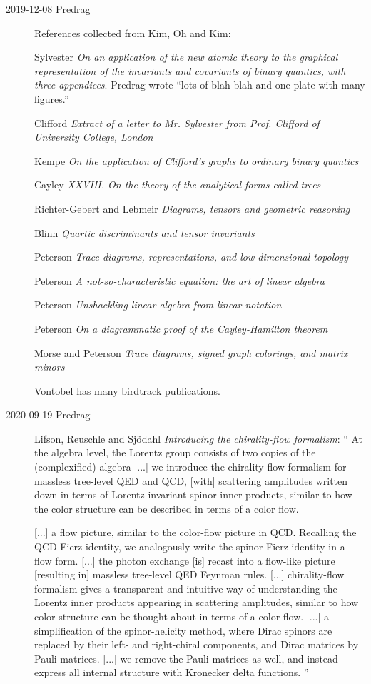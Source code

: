 \begin{description}
\item[2019-12-08 Predrag]
References collected from Kim, Oh and Kim:

Sylvester {\em On an application of the new atomic
theory to the graphical representation of the invariants and covariants
of binary quantics, with three appendices}.
Predrag wrote
``lots of blah-blah and one plate with many figures.''

Clifford {\em Extract of a letter to {Mr. Sylvester}
from {Prof. Clifford} of {University College, London}}

Kempe
{\em On the application of {Clifford}'s graphs to ordinary binary quantics}

Cayley
{\em {XXVIII}. {On} the theory of the analytical forms called trees}

Richter-Gebert and Lebmeir
{\em Diagrams, tensors and geometric reasoning}

Blinn
{\em Quartic discriminants and tensor invariants}

Peterson
{\em {Trace diagrams, representations, and  low-dimensional topology}}

Peterson
{\em A not-so-characteristic equation: the art of linear algebra}

Peterson
{\em Unshackling linear algebra from linear notation}

Peterson
{\em On a diagrammatic proof of the {Cayley-Hamilton} theorem}

Morse and Peterson
{\em Trace diagrams, signed graph colorings, and matrix minors}

{Vontobel} has many birdtrack publications.

\item[2020-09-19 Predrag]
Lifson, Reuschle and Sj{\"o}dahl
{\em Introducing the chirality-flow formalism}: ``
At the algebra level, the Lorentz group consists of two copies of the
(complexified)  algebra [...] we
introduce the chirality-flow formalism for massless tree-level QED and
QCD, [with] scattering amplitudes
 written down in terms of Lorentz-invariant spinor inner
products, similar to how the color structure can be described in terms of
a color flow.

[...] a flow picture, similar to the color-flow picture in QCD. Recalling
the QCD Fierz identity, we analogously write the spinor Fierz identity in
a flow form. [...] the photon exchange [is] recast into a flow-like
picture [resulting in] massless tree-level QED Feynman rules. [...]
chirality-flow formalism gives a transparent and intuitive way of
understanding the Lorentz inner products appearing in scattering
amplitudes, similar to how color structure can be thought about in terms
of a color flow. [...] a simplification of the spinor-helicity
method, where Dirac spinors are replaced by their left- and right-chiral
components, and Dirac matrices by Pauli matrices. [...] we
remove the Pauli matrices as well, and instead express all
internal structure with Kronecker delta functions.
''


\end{description}
